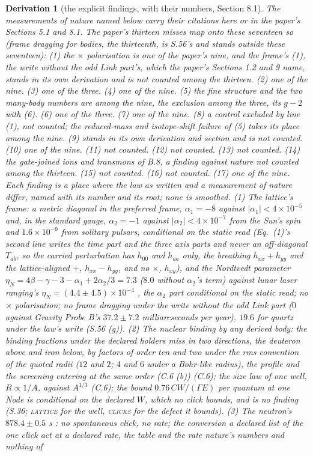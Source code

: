 \documentclass[pdflatex,sn-mathphys-num]{sn-jnl}
\newcommand{\fence}[1]{\textup{\textsc{#1}}}
\theoremstyle{thmstyleone}
\newtheorem{derivation}{Derivation}
\begin{document}
\begin{derivation}[the explicit findings, with their numbers, Section 8.1]
The measurements of nature named below carry their citations here or in the paper's Sections 5.1 and 8.1. The paper's thirteen misses map onto these seventeen so (frame dragging for bodies, the thirteenth, is S.56's and stands outside these seventeen): (1) the $\times$ polarisation is one of the paper's nine, and the frame's (1), the write without the odd Link part's, which the paper's Sections 1.2 and 9 name, stands in its own derivation and is not counted among the thirteen. (2) one of the nine. (3) one of the three. (4) one of the nine. (5) the fine structure and the two many-body numbers are among the nine, the exclusion among the three, its $g - 2$ with (6). (6) one of the three. (7) one of the nine. (8) a control excluded by line (1), not counted; the reduced-mass and isotope-shift failure of (5) takes its place among the nine. (9) stands in its own derivation and section and is not counted. (10) one of the nine. (11) not counted. (12) not counted. (13) not counted. (14) the gate-joined ions and transmons of B.8, a finding against nature not counted among the thirteen. (15) not counted. (16) not counted. (17) one of the nine. Each finding is a place where the law as written and a measurement of nature differ, named with its number and its root; none is smoothed. (1) The lattice's frame: a metric diagonal in the preferred frame, $\alpha_1 = -8$ against $|\alpha_1| < 4 \times 10^{-5}$ and, in the standard gauge, $\alpha_2 = -1$ against $|\alpha_2| < 4 \times 10^{-7}$ from the Sun's spin and $1.6 \times 10^{-9}$ from solitary pulsars, conditional on the static read (Eq.~(1)'s second line writes the time part and the three axis parts and never an off-diagonal $T_{ab}$, so the carried perturbation has $h_{00}$ and $h_{aa}$ only, the breathing $h_{xx} + h_{yy}$ and the lattice-aligned $+$, $h_{xx} - h_{yy}$, and no $\times$, $h_{xy}$), and the Nordtvedt parameter $\eta_N = 4\beta - \gamma - 3 - \alpha_1 + 2\alpha_2 / 3 = 7.3$ ($8.0$ without $\alpha_2$'s term) against lunar laser ranging's $\eta_N = (4.4 \pm 4.5) \times 10^{-4}$ \cite{will,williams}, the $\alpha_2$ part conditional on the static read; no $\times$ polarisation; no frame dragging under the write without the odd Link part ($0$ against Gravity Probe B's $37.2 \pm 7.2$ milliarcseconds per year), $19.6$ for quartz under the law's write (S.56 (g)). (2) The nuclear binding by any derived body: the binding fractions under the declared holders miss in two directions, the deuteron above and iron below, by factors of order ten and two under the rms convention of the quoted radii ($12$ and $2$; $4$ and $6$ under a Bohr-like radius), the profile and the screening entering at the same order (C.6 (b)) (C.6); the size law of one well, $R \propto 1 / A$, against $A^{1/3}$ (C.6); the bound $0.76\,CW / (\Gamma E)$ per quantum at one Node is conditional on the declared $W$, which no click bounds, and is no finding (S.36; \fence{lattice} for the well, \fence{clicks} for the defect it bounds). (3) The neutron's $878.4 \pm 0.5$ s \cite{pdg}: no spontaneous click, no rate; the conversion a declared list of the one click act at a declared rate, the table and the rate nature's numbers and nothing of 
\end{derivation}
\end{document}
